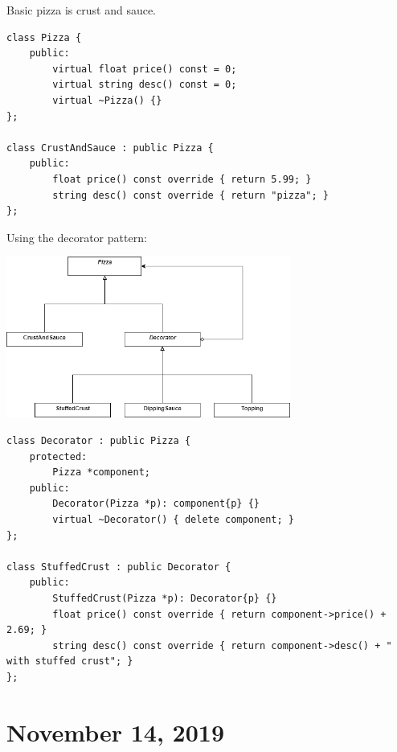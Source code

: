 \documentclass[11pt]{article}
\theoremstyle{definition}
\begin{document}
Basic pizza is crust and sauce.
\begin{lstlisting}
class Pizza {
    public:
        virtual float price() const = 0;
        virtual string desc() const = 0;
        virtual ~Pizza() {}
};

class CrustAndSauce : public Pizza {
    public:
        float price() const override { return 5.99; }
        string desc() const override { return "pizza"; }
};
\end{lstlisting}
\vspace{-0.25cm}
Using the decorator pattern:
\begin{center}
\includegraphics[width=0.7\textwidth]{images/pizza2.png}
\end{center}

\begin{lstlisting}
class Decorator : public Pizza {
    protected:
        Pizza *component;
    public:
        Decorator(Pizza *p): component{p} {}
        virtual ~Decorator() { delete component; }
};

class StuffedCrust : public Decorator {
    public:
        StuffedCrust(Pizza *p): Decorator{p} {}
        float price() const override { return component->price() + 2.69; }
        string desc() const override { return component->desc() + " with stuffed crust"; }
};
\end{lstlisting}

\newpage
\section{November 14, 2019}
\end{document}
